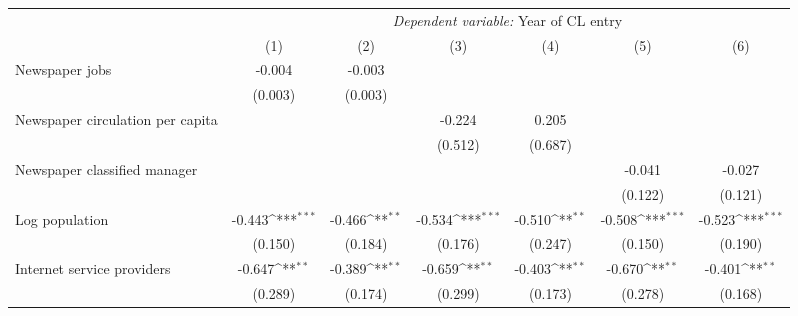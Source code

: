 {
\def\sym#1{\ifmmode^{#1}\else\(^{#1}\)\fi}
\begin{tabular}{l*{6}{c}}
\toprule
                    &\multicolumn{6}{c}{\textit{Dependent variable:} Year of CL entry}                                                                  \\\cmidrule(lr){2-7}
                    &\multicolumn{1}{c}{(1)}         &\multicolumn{1}{c}{(2)}         &\multicolumn{1}{c}{(3)}         &\multicolumn{1}{c}{(4)}         &\multicolumn{1}{c}{(5)}         &\multicolumn{1}{c}{(6)}         \\
\midrule
Newspaper jobs      &      -0.004         &      -0.003         &                     &                     &                     &                     \\
                    &     (0.003)         &     (0.003)         &                     &                     &                     &                     \\
\addlinespace
Newspaper circulation per capita&                     &                     &      -0.224         &       0.205         &                     &                     \\
                    &                     &                     &     (0.512)         &     (0.687)         &                     &                     \\
\addlinespace
Newspaper classified manager&                     &                     &                     &                     &      -0.041         &      -0.027         \\
                    &                     &                     &                     &                     &     (0.122)         &     (0.121)         \\
\addlinespace
Log population      &      -0.443\sym{***}&      -0.466\sym{**} &      -0.534\sym{***}&      -0.510\sym{**} &      -0.508\sym{***}&      -0.523\sym{***}\\
                    &     (0.150)         &     (0.184)         &     (0.176)         &     (0.247)         &     (0.150)         &     (0.190)         \\
\addlinespace
Internet service providers&      -0.647\sym{**} &      -0.389\sym{**} &      -0.659\sym{**} &      -0.403\sym{**} &      -0.670\sym{**} &      -0.401\sym{**} \\
                    &     (0.289)         &     (0.174)         &     (0.299)         &     (0.173)         &     (0.278)         &     (0.168)         \\

\end{tabular}}
